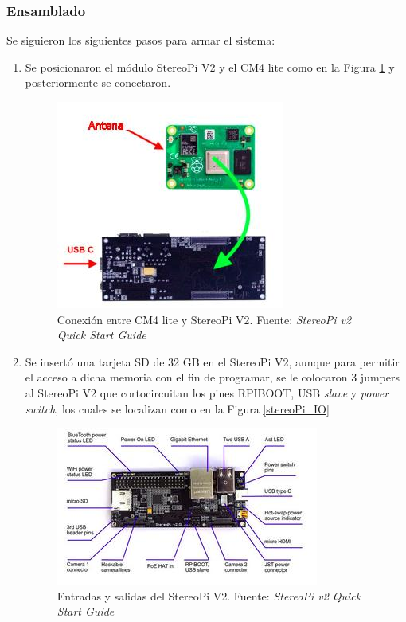 \subsubsection{Ensamblado}
Se siguieron los siguientes pasos para armar el sistema:
\begin{enumerate}
    \item Se posicionaron el módulo StereoPi V2 y el CM4 lite como en la Figura \ref{connect_cm4} y posteriormente se conectaron.
    \begin{figure}[H]
        \centering
        \includegraphics{Recursos/cm4_connect.jpg}
        \caption[Conexión entre CM4 lite y StereoPi V2.]{Conexión entre CM4 lite y StereoPi V2. {\footnotesize Fuente: \textit{StereoPi v2 Quick Start Guide} \cite{realizator_2021}}}
        \label{connect_cm4}
    \end{figure}
    \item Se insertó una tarjeta SD de 32 GB en el StereoPi V2, aunque para permitir el acceso a dicha memoria con el fin de programar, se le colocaron 3 jumpers al StereoPi V2 que cortocircuitan los pines RPIBOOT, USB \textit{slave} y \textit{power switch}, los cuales se localizan como en la Figura \ref{stereoPi_IO}
    \begin{figure}[H]
        \centering
        \includegraphics{Recursos/stereoPi_IO.jpg}
        \caption[Entradas y salidas del StereoPi V2.]{Entradas y salidas del StereoPi V2. {\footnotesize Fuente: \textit{StereoPi v2 Quick Start Guide} \cite{realizator_2021}}}

\end{figure}
\end{enumerate}
